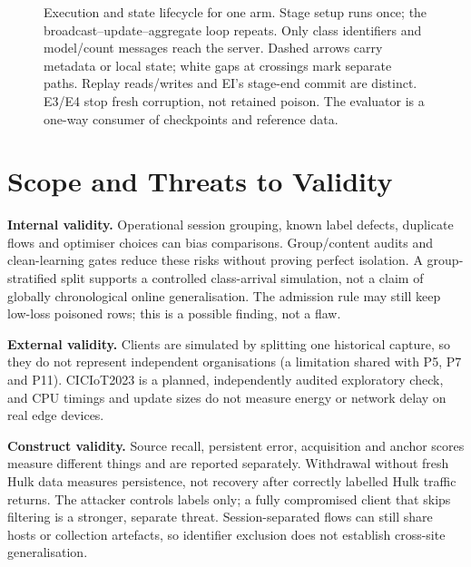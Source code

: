 \documentclass[10pt,a4paper]{article}
\begin{document}
\begin{figure}[H]
{}
\caption{Execution and state lifecycle for one arm. Stage setup runs once; the broadcast--update--aggregate loop repeats. Only class identifiers and model/count messages reach the server. Dashed arrows carry metadata or local state; white gaps at crossings mark separate paths. Replay reads/writes and EI's stage-end commit are distinct. E3/E4 stop fresh corruption, not retained poison. The evaluator is a one-way consumer of checkpoints and reference data.}
\label{fig:framework}
\end{figure}

\clearpage
\section{Scope and Threats to Validity}
\textbf{Internal validity.} Operational session grouping, known label defects, duplicate flows and optimiser choices can bias comparisons. Group/content audits and clean-learning gates reduce these risks without proving perfect isolation. A group-stratified split supports a controlled class-arrival simulation, not a claim of globally chronological online generalisation. The admission rule may still keep low-loss poisoned rows; this is a possible finding, not a flaw.

\textbf{External validity.} Clients are simulated by splitting one historical capture, so they do not represent independent organisations (a limitation shared with P5, P7 and P11). CICIoT2023 is a planned, independently audited exploratory check, and CPU timings and update sizes do not measure energy or network delay on real edge devices.

\textbf{Construct validity.} Source recall, persistent error, acquisition and anchor scores measure different things and are reported separately. Withdrawal without fresh Hulk data measures persistence, not recovery after correctly labelled Hulk traffic returns. The attacker controls labels only; a fully compromised client that skips filtering is a stronger, separate threat. Session-separated flows can still share hosts or collection artefacts, so identifier exclusion does not establish cross-site generalisation.
\end{document}
